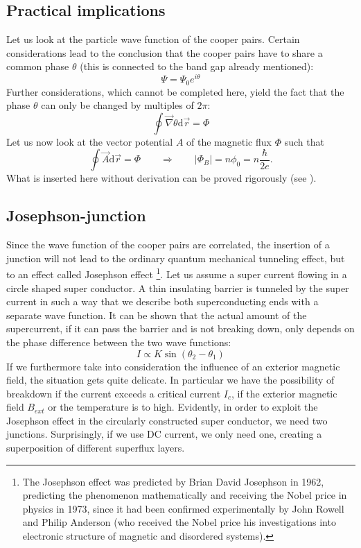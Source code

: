 \subsection{Practical implications}
Let us look at the particle wave function of the cooper pairs. Certain
considerations\cite{Landau} lead to the conclusion that the cooper pairs
have to share a common phase $\theta$ (this is connected to the band gap
already mentioned):  
\begin{equation}
\Psi = \Psi_0 e^{i\theta}
\end{equation}
Further considerations, which cannot be completed here, 
yield the fact that the phase $\theta$ can
only be changed by multiples of $2\pi$:
\begin{equation}
\oint \vec{\nabla}\theta \mathrm{d} \vec{r}  = \Phi
\end{equation}
Let us now look at the vector potential $A$ of the 
magnetic flux $\Phi$ such that 
\begin{equation}
\oint \vec{A} \mathrm{d} \vec{r}  = \Phi \qquad 
\Rightarrow \qquad |\Phi_B| = n \phi_0 = n \frac{\hbar}{2e}.
\end{equation} 
What is inserted here without derivation can be proved rigorously (see \cite{Landau}).
\subsection{Josephson-junction}
Since the wave function of the cooper pairs are correlated, the insertion of a junction
will not lead to the ordinary quantum mechanical tunneling effect, but to an
effect called Josephson effect%
\footnote{The Josephson effect was predicted by Brian David Josephson in 1962, predicting
the phenomenon mathematically and receiving the Nobel price in physics in 1973, since
it had been confirmed experimentally by John Rowell and Philip Anderson (who received the
Nobel price his investigations into electronic structure of magnetic and disordered systems). 
}.
Let us assume a super current flowing in a circle shaped
super conductor. A thin insulating barrier is tunneled by the super current in such a way
that we describe both superconducting ends with a separate wave function. It can be shown
that the actual amount of the supercurrent, if it can pass the barrier and is not breaking down,
only depends on the phase difference between the two wave functions\cite{ver}:
\begin{equation}
I \propto K \sin(\theta_2 - \theta_1)
\end{equation}
If we furthermore take into consideration the influence of an exterior magnetic field,
the situation gets quite delicate. In particular we have the possibility of breakdown
if the current exceeds a critical current $I_c$, if the exterior magnetic field $B_{ext}$ or
the temperature is to high. Evidently, in order to exploit the Josephson effect in the circularly
constructed super conductor, we need two junctions. Surprisingly, if we use DC current, we only
need one, creating a superposition of different superflux layers.

